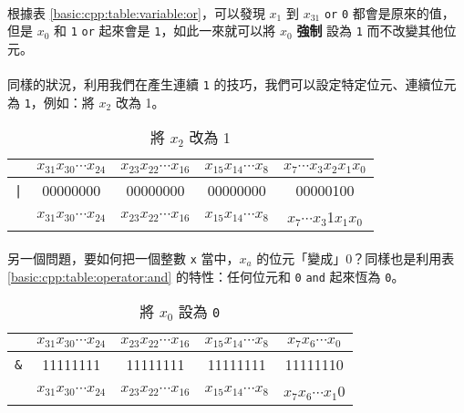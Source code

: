 \documentclass[12pt,a4paper,oneside]{article}
\begin{document}
\begin{CJK}{UTF8}{bkai}
\paragraph{}根據表 \ref{basic:cpp:table:variable:or}，可以發現 $x_{1}$ 到 $x_{31}$ \texttt{or} \lstinline!0! 都會是原來的值，但是 $x_0$ 和 \lstinline!1! \texttt{or} 起來會是 \lstinline!1!，如此一來就可以將 $x_0$ \textbf{強制} 設為 \lstinline!1! 而不改變其他位元。
\paragraph{}同樣的狀況，利用我們在產生連續 \lstinline!1! 的技巧，我們可以設定特定位元、連續位元為 \lstinline!1!，例如：將 $x_2$ 改為 1。

\begin{table}[h!]
\centering
\begin{tabular}{|c|c|c|c|c|}
\hline
 & $x_{31}x_{30}\cdots{x_{24}}$ & $x_{23}x_{22}\cdots{x_{16}}$ & $x_{15}x_{14}\cdots{x_{8}}$ & $x_{7}\cdots{x_{3}}x_{2}x_{1}x_{0}$\\
\hline
\lstinline!|! & 00000000 & 00000000 & 00000000 & 00000{\color{red}1}00\\
\hline
\hline
 & $x_{31}x_{30}\cdots{x_{24}}$ & $x_{23}x_{22}\cdots{x_{16}}$ & $x_{15}x_{14}\cdots{x_{8}}$ & $x_{7}\cdots{x_{3}}${\color{red}1}$x_{1}x_{0}$\\
\hline
\end{tabular}
\caption{將 $x_2$ 改為 1}
\label{basic:cpp:table:setbit:x2}
\end{table}

\paragraph{}另一個問題，要如何把一個整數 \lstinline!x! 當中，$x_a$ 的位元「變成」0？同樣也是利用表 \ref{basic:cpp:table:operator:and} 的特性：任何位元和 \lstinline!0! \texttt{and} 起來恆為 \lstinline!0!。

\begin{table}[h!]
\centering
\begin{tabular}{|c|c|c|c|c|}
\hline
 & $x_{31}x_{30}\cdots{x_{24}}$ & $x_{23}x_{22}\cdots{x_{16}}$ & $x_{15}x_{14}\cdots{x_{8}}$ & $x_{7}x_{6}\cdots{x_{0}}$\\
\hline
\lstinline!&! & 11111111 & 11111111 & 11111111 & 1111111{\color{red}0}\\
\hline\hline
 & $x_{31}x_{30}\cdots{x_{24}}$ & $x_{23}x_{22}\cdots{x_{16}}$ & $x_{15}x_{14}\cdots{x_{8}}$ & $x_{7}x_{6}\cdots{x_{1}}${\color{red}0}\\
\hline
\end{tabular}
\caption{將 $x_0$ 設為 \lstinline!0!}
\label{basic:cpp:table:setbit:x0:0}
\end{table}


\end{CJK}
\end{document}
